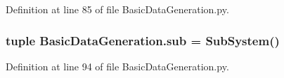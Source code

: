 Definition at line 85 of file Basic\+Data\+Generation.\+py.

\hypertarget{namespace_basic_data_generation_a50c64aa781e6b18a68c7db9a296e539d}{}
\subsubsection[{sub}]{\setlength{\rightskip}{0pt plus 5cm}tuple Basic\+Data\+Generation.\+sub = {\bf Sub\+System}()}\label{namespace_basic_data_generation_a50c64aa781e6b18a68c7db9a296e539d}


Definition at line 94 of file Basic\+Data\+Generation.\+py.

